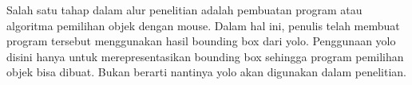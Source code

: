 Salah satu tahap dalam alur penelitian adalah pembuatan program atau algoritma pemilihan objek dengan mouse.
Dalam hal ini, penulis telah membuat program tersebut menggunakan hasil bounding box dari yolo. Penggunaan yolo
disini hanya untuk merepresentasikan bounding box sehingga program pemilihan objek bisa dibuat. Bukan berarti
nantinya yolo akan digunakan dalam penelitian.